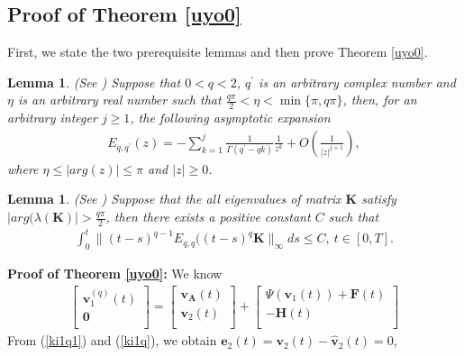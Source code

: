 \documentclass[9pt]{article}
\newtheorem{lemma}[theorem]{Lemma}
\numberwithin{equation}{section}
\begin{document}
\subsection{Proof of Theorem \ref{uyo0}}
First, we state the two prerequisite lemmas and then prove Theorem \ref{uyo0}.
\begin{lemma}\label{lemma1-1}
(See \cite{Pod,Quin}) Suppose that $0<q<2$, $q^{\prime}$ is an arbitrary complex number and $\eta$ is an arbitrary real number such that $\frac{q\pi }{2}<\eta<\min\{\pi, q\pi\}$, then, for an arbitrary integer $j\geq1$, the following asymptotic expansion
\begin{eqnarray*}
E_{q ,q^{\prime} }(z)=-\sum_{k=1}^{j}\frac{1}{\Gamma(q^{\prime}-qk)}\frac{1}{z^k}+O\left( \frac{1}{|z|^{j+1}}\right),
\end{eqnarray*}
where $\eta\leq |arg(z)|\leq \pi$ and $|z|\geq0 $.
\end{lemma}
\begin{lemma}\label{lem-4-3}
(See \cite{Quin}) Suppose that the all eigenvalues of matrix $\textbf{K}$ satisfy $|arg(\lambda(\textbf{K})|>\frac{q \pi}{2}$, then there exists a positive constant $C$ such that
\begin{eqnarray*}
\int_{0}^{t}\|(t-s)^{q -1}E_{q,q }((t-s)^{q }\textbf{K}\|_{\infty}ds\leq C, ~t\in [0,T].
\end{eqnarray*}
\end{lemma}
\textbf{Proof of Theorem \ref{uyo0}:} We know
\begin{eqnarray}\label{ki1q}
\left[
  \begin{array}{c}
    \textbf{v}_1^{(q)}(t)\\
    \textbf{0}\\
  \end{array}
\right]=\left[
                 \begin{array}{c}
                  \textbf{v}_{\mathbf{A}}(t) \\
                   \textbf{v}_2(t) \\
                 \end{array}
               \right]+\left[
                         \begin{array}{c}
                           \Psi(\textbf{v}_1(t))+\textbf{F}(t) \\
                           -\textbf{H}(t) \\
                         \end{array}
                       \right]
\end{eqnarray}
From (\ref{ki1q1}) and (\ref{ki1q}), we obtain $\textbf{e}_{2}(t)=\textbf{v}_{2}(t)-\widehat{\textbf{v}}_2(t)=0$,
\end{document}

